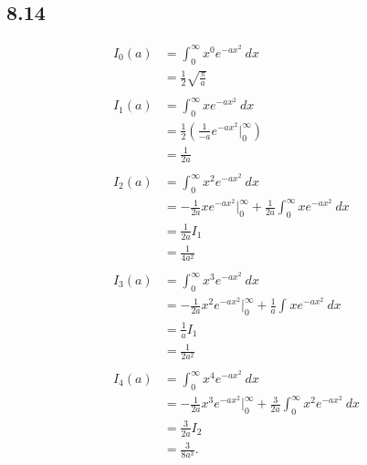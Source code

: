 \documentclass[10pt]{mypackage}
\begin{document}
\subsection{8.14}%
\begin{align*}
  I_0\left(a\right) &= \int_{0}^{\infty} x^{0}e^{-ax^2}\:dx\\
                    &= \frac{1}{2}\sqrt{\frac{\pi}{a}}\\
                    \\
  I_1\left(a\right) &= \int_{0}^{\infty} xe^{-ax^2}\:dx\\
                    &= \frac{1}{2}\left(\frac{1}{-a}e^{-ax^2}\bigr\vert_{0}^{\infty}\right)\\
                    &= \frac{1}{2a}\\
                    \\
  I_2\left(a\right) &= \int_{0}^{\infty} x^2e^{-ax^2}\:dx\\
                    &= -\frac{1}{2a}xe^{-ax^2}\bigr\vert_{0}^{\infty} + \frac{1}{2a}\int_{0}^{\infty} xe^{-ax^2}\:dx\\
                    &= \frac{1}{2a}I_1\\
                    &= \frac{1}{4a^2}\\
                    \\
  I_3\left(a\right) &= \int_{0}^{\infty} x^3e^{-ax^2}\:dx\\
                    &= -\frac{1}{2a}x^2e^{-ax^2}\bigr\vert_{0}^{\infty} + \frac{1}{a}\int_{}^{} xe^{-ax^2}\:dx\\
                    &= \frac{1}{a}I_1\\
                    &= \frac{1}{2a^2}\\
                    \\
  I_4\left(a\right) &= \int_{0}^{\infty} x^4e^{-ax^2}\:dx\\
                    &= -\frac{1}{2a}x^3e^{-ax^2}\bigr\vert_{0}^{\infty} + \frac{3}{2a}\int_{0}^{\infty} x^2e^{-ax^2}\:dx\\
                    &= \frac{3}{2a}I_2\\
                    &= \frac{3}{8a^3}.
\end{align*}
\end{document}
